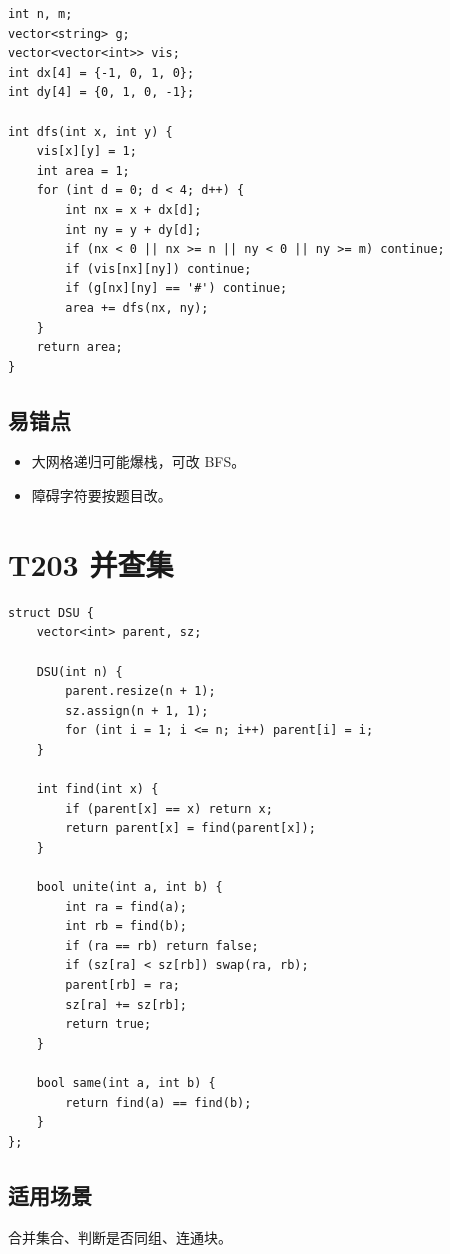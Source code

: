 \begin{lstlisting}
int n, m;
vector<string> g;
vector<vector<int>> vis;
int dx[4] = {-1, 0, 1, 0};
int dy[4] = {0, 1, 0, -1};

int dfs(int x, int y) {
    vis[x][y] = 1;
    int area = 1;
    for (int d = 0; d < 4; d++) {
        int nx = x + dx[d];
        int ny = y + dy[d];
        if (nx < 0 || nx >= n || ny < 0 || ny >= m) continue;
        if (vis[nx][ny]) continue;
        if (g[nx][ny] == '#') continue;
        area += dfs(nx, ny);
    }
    return area;
}
\end{lstlisting}

\subsection{易错点}

\begin{itemize}
  \item 大网格递归可能爆栈，可改 BFS。
  \item 障碍字符要按题目改。
\end{itemize}

\section{T203 并查集}\label{sec:09-17}\label{tpl:203}

\begin{lstlisting}
struct DSU {
    vector<int> parent, sz;

    DSU(int n) {
        parent.resize(n + 1);
        sz.assign(n + 1, 1);
        for (int i = 1; i <= n; i++) parent[i] = i;
    }

    int find(int x) {
        if (parent[x] == x) return x;
        return parent[x] = find(parent[x]);
    }

    bool unite(int a, int b) {
        int ra = find(a);
        int rb = find(b);
        if (ra == rb) return false;
        if (sz[ra] < sz[rb]) swap(ra, rb);
        parent[rb] = ra;
        sz[ra] += sz[rb];
        return true;
    }

    bool same(int a, int b) {
        return find(a) == find(b);
    }
};
\end{lstlisting}

\subsection{适用场景}

合并集合、判断是否同组、连通块。


